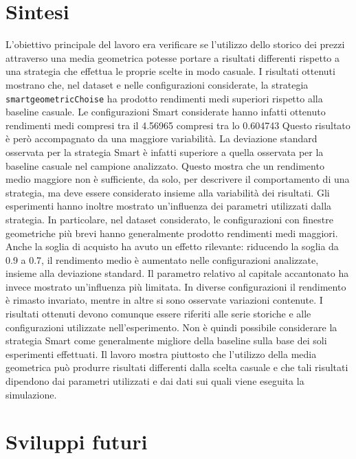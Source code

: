 \documentclass[12pt,a4paper,oneside]{report}
\begin{document}
\section{Sintesi}

L'obiettivo principale del lavoro era verificare se l'utilizzo dello storico dei
prezzi attraverso una media geometrica potesse portare a risultati differenti rispetto
a una strategia che effettua le proprie scelte in modo casuale.
I risultati ottenuti mostrano che, nel dataset e nelle configurazioni considerate,
la strategia \texttt{smartgeometricChoise} ha prodotto rendimenti medi superiori rispetto
alla baseline casuale. Le configurazioni Smart considerate hanno infatti ottenuto rendimenti
medi compresi tra il 4.56965%
compresi tra lo 0.604743%
Questo risultato è però accompagnato da una maggiore variabilità. La deviazione standard
osservata per la strategia Smart è infatti superiore a quella osservata per la baseline
casuale nel campione analizzato. Questo mostra che un rendimento medio maggiore non è
sufficiente, da solo, per descrivere il comportamento di una strategia, ma deve essere
considerato insieme alla variabilità dei risultati.
Gli esperimenti hanno inoltre mostrato un'influenza dei parametri utilizzati dalla strategia.
In particolare, nel dataset considerato, le configurazioni con finestre geometriche più brevi
hanno generalmente prodotto rendimenti medi maggiori. Anche la soglia di acquisto ha avuto un
effetto rilevante: riducendo la soglia da 0.9 a 0.7, il rendimento medio è aumentato nelle
configurazioni analizzate, insieme alla deviazione standard.
Il parametro relativo al capitale accantonato ha invece mostrato un'influenza più limitata.
In diverse configurazioni il rendimento è rimasto invariato, mentre in altre si sono osservate variazioni contenute.
I risultati ottenuti devono comunque essere riferiti alle serie storiche e alle configurazioni
utilizzate nell'esperimento. Non è quindi possibile considerare la strategia Smart come
generalmente migliore della baseline sulla base dei soli esperimenti effettuati. Il lavoro
mostra piuttosto che l'utilizzo della media geometrica può produrre risultati differenti dalla
scelta casuale e che tali risultati dipendono dai parametri utilizzati e dai dati sui quali
viene eseguita la simulazione.

\section{Sviluppi futuri}
\end{document}
